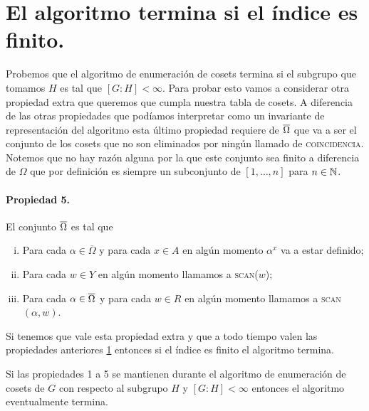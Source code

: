 \documentclass[tesis.tex]{subfiles}
\newcommand{\coin}{\textsc{coincidencia}}
\newcommand{\scan}{\textsc{scan}}
\begin{document}
\section{El algoritmo termina si el índice es finito.}

Probemos que el algoritmo de enumeración de cosets termina si el subgrupo que tomamos $H$ es tal que $[G:H] < \infty$.
Para probar esto vamos a considerar otra propiedad extra que queremos que cumpla nuestra tabla de cosets.
A diferencia de las otras propiedades que podíamos interpretar como un invariante de representación del algoritmo esta último propiedad requiere de $ \overline \Omega$ que va a ser el conjunto de los cosets que no son eliminados por ningún llamado de \coin.
Notemos que no hay razón alguna por la que este conjunto sea finito a diferencia de $\Omega$ que por definición es siempre un subconjunto de $[1, \dots, n]$ para $n \in \mathbb{N}$.

\paragraph{\textbf{Propiedad 5.}} \label{coset-enum_p5} El conjunto $\overline \Omega$ es tal que
\begin{enumerate}[(i)]
	\item Para cada $\alpha \in \overline \Omega$ y para cada $x \in A$ en algún momento $\alpha^x$ va a estar definido;
	\item Para cada $w \in Y$ en algún momento llamamos a \scan($w$);
	\item Para cada $\alpha \in \overline \Omega$ y para cada $w \in R$ en algún momento llamamos a \scan$(\alpha, w)$.
\end{enumerate}

Si tenemos que vale esta propiedad extra y que a todo tiempo valen las propiedades anteriores \ref{} entonces si el índice es finito el algoritmo termina.

\begin{teo}
	Si las propiedades 1 a 5 se mantienen durante el algoritmo de enumeración de cosets de $G$ con respecto al subgrupo $H$ y $[G:H] < \infty$ entonces el algoritmo eventualmente termina.
\end{teo}
\end{document}
